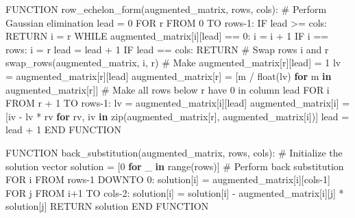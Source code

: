 \documentclass[
  letterpaper,
  DIV=11,
  numbers=noendperiod]{scrreprt}
\newenvironment{Shaded}{\begin{snugshade}}{\end{snugshade}}
\newcommand{\BuiltInTok}[1]{\textcolor[rgb]{0.00,0.23,0.31}{#1}}
\newcommand{\CommentTok}[1]{\textcolor[rgb]{0.37,0.37,0.37}{#1}}
\newcommand{\ControlFlowTok}[1]{\textcolor[rgb]{0.00,0.23,0.31}{\textbf{#1}}}
\newcommand{\DecValTok}[1]{\textcolor[rgb]{0.68,0.00,0.00}{#1}}
\newcommand{\KeywordTok}[1]{\textcolor[rgb]{0.00,0.23,0.31}{\textbf{#1}}}
\newcommand{\NormalTok}[1]{\textcolor[rgb]{0.00,0.23,0.31}{#1}}
\newcommand{\OperatorTok}[1]{\textcolor[rgb]{0.37,0.37,0.37}{#1}}
\theoremstyle{plain}
\theoremstyle{definition}
\theoremstyle{remark}
\begin{document}
\begin{Shaded}
\begin{Highlighting}[]
\NormalTok{FUNCTION row\_echelon\_form(augmented\_matrix, rows, cols):}
    \CommentTok{\# Perform Gaussian elimination}
\NormalTok{    lead }\OperatorTok{=} \DecValTok{0}
\NormalTok{    FOR r FROM }\DecValTok{0}\NormalTok{ TO rows}\OperatorTok{{-}}\DecValTok{1}\NormalTok{:}
\NormalTok{        IF lead }\OperatorTok{\textgreater{}=}\NormalTok{ cols:}
\NormalTok{            RETURN}
\NormalTok{        i }\OperatorTok{=}\NormalTok{ r}
\NormalTok{        WHILE augmented\_matrix[i][lead] }\OperatorTok{==} \DecValTok{0}\NormalTok{:}
\NormalTok{            i }\OperatorTok{=}\NormalTok{ i }\OperatorTok{+} \DecValTok{1}
\NormalTok{            IF i }\OperatorTok{==}\NormalTok{ rows:}
\NormalTok{                i }\OperatorTok{=}\NormalTok{ r}
\NormalTok{                lead }\OperatorTok{=}\NormalTok{ lead }\OperatorTok{+} \DecValTok{1}
\NormalTok{                IF lead }\OperatorTok{==}\NormalTok{ cols:}
\NormalTok{                    RETURN}
        \CommentTok{\# Swap rows i and r}
\NormalTok{        swap\_rows(augmented\_matrix, i, r)}
        \CommentTok{\# Make augmented\_matrix[r][lead] = 1}
\NormalTok{        lv }\OperatorTok{=}\NormalTok{ augmented\_matrix[r][lead]}
\NormalTok{        augmented\_matrix[r] }\OperatorTok{=}\NormalTok{ [m }\OperatorTok{/} \BuiltInTok{float}\NormalTok{(lv) }\ControlFlowTok{for}\NormalTok{ m }\KeywordTok{in}\NormalTok{ augmented\_matrix[r]]}
        \CommentTok{\# Make all rows below r have 0 in column lead}
\NormalTok{        FOR i FROM r }\OperatorTok{+} \DecValTok{1}\NormalTok{ TO rows}\OperatorTok{{-}}\DecValTok{1}\NormalTok{:}
\NormalTok{            lv }\OperatorTok{=}\NormalTok{ augmented\_matrix[i][lead]}
\NormalTok{            augmented\_matrix[i] }\OperatorTok{=}\NormalTok{ [iv }\OperatorTok{{-}}\NormalTok{ lv }\OperatorTok{*}\NormalTok{ rv }\ControlFlowTok{for}\NormalTok{ rv, iv }\KeywordTok{in} \BuiltInTok{zip}\NormalTok{(augmented\_matrix[r], augmented\_matrix[i])]}
\NormalTok{        lead }\OperatorTok{=}\NormalTok{ lead }\OperatorTok{+} \DecValTok{1}
\NormalTok{END FUNCTION}

\NormalTok{FUNCTION back\_substitution(augmented\_matrix, rows, cols):}
    \CommentTok{\# Initialize the solution vector}
\NormalTok{    solution }\OperatorTok{=}\NormalTok{ [}\DecValTok{0} \ControlFlowTok{for}\NormalTok{ \_ }\KeywordTok{in} \BuiltInTok{range}\NormalTok{(rows)]}
    \CommentTok{\# Perform back substitution}
\NormalTok{    FOR i FROM rows}\OperatorTok{{-}}\DecValTok{1}\NormalTok{ DOWNTO }\DecValTok{0}\NormalTok{:}
\NormalTok{        solution[i] }\OperatorTok{=}\NormalTok{ augmented\_matrix[i][cols}\OperatorTok{{-}}\DecValTok{1}\NormalTok{]}
\NormalTok{        FOR j FROM i}\OperatorTok{+}\DecValTok{1}\NormalTok{ TO cols}\OperatorTok{{-}}\DecValTok{2}\NormalTok{:}
\NormalTok{            solution[i] }\OperatorTok{=}\NormalTok{ solution[i] }\OperatorTok{{-}}\NormalTok{ augmented\_matrix[i][j] }\OperatorTok{*}\NormalTok{ solution[j]}
\NormalTok{    RETURN solution}
\NormalTok{END FUNCTION}


\end{Highlighting}
\end{Shaded}
\end{document}
